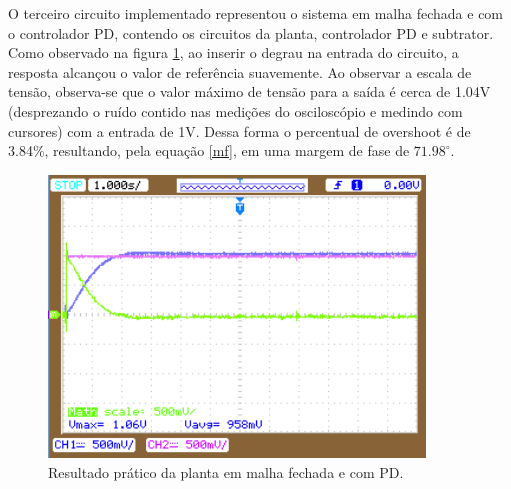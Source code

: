 O terceiro circuito implementado representou o sistema em malha fechada e com o controlador PD, contendo os circuitos da planta, controlador PD e subtrator. Como observado na figura \ref{res:pd3}, ao inserir o degrau na entrada do circuito, a resposta alcançou o valor de referência suavemente. Ao observar a escala de tensão, observa-se que o valor máximo de tensão para a saída é cerca de 1.04V (desprezando o ruído contido nas medições do osciloscópio e medindo com cursores) com a entrada de 1V. Dessa forma o percentual de overshoot é de 3.84\%, resultando, pela equação \ref{mf}, em uma margem de fase de $71.98^{\circ}$.

\begin{figure}[h!]
\begin{center}
    \includegraphics[width=10cm]{images/PD_pratico/c1.png}  
\end{center}
\caption{Resultado prático da planta em malha fechada e com PD.}
\label{res:pd3} 
\end{figure}

\pagebreak